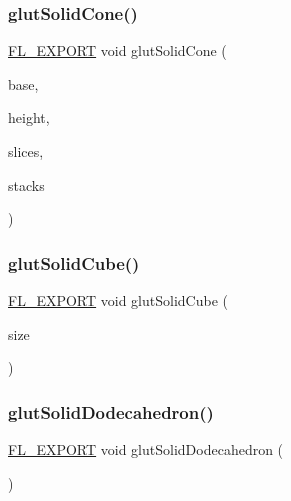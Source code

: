 \subsubsection{\texorpdfstring{glut\+Solid\+Cone()}{glutSolidCone()}}
{\footnotesize\ttfamily \hyperlink{_fl___export_8_h_aa9ba29a18aee9d738370a06eeb4470fc}{F\+L\+\_\+\+E\+X\+P\+O\+RT} void glut\+Solid\+Cone (\begin{DoxyParamCaption}\item[{G\+Ldouble}]{base,  }\item[{G\+Ldouble}]{height,  }\item[{G\+Lint}]{slices,  }\item[{G\+Lint}]{stacks }\end{DoxyParamCaption})}

\mbox{\label{glut_8_h_a129c177869766ce7b05d2465c016cd1d}} 
\subsubsection{\texorpdfstring{glut\+Solid\+Cube()}{glutSolidCube()}}
{\footnotesize\ttfamily \hyperlink{_fl___export_8_h_aa9ba29a18aee9d738370a06eeb4470fc}{F\+L\+\_\+\+E\+X\+P\+O\+RT} void glut\+Solid\+Cube (\begin{DoxyParamCaption}\item[{G\+Ldouble}]{size }\end{DoxyParamCaption})}

\mbox{\label{glut_8_h_a2d26e5dd9997f1eaaf7afdbed4f1422b}} 
\subsubsection{\texorpdfstring{glut\+Solid\+Dodecahedron()}{glutSolidDodecahedron()}}
{\footnotesize\ttfamily \hyperlink{_fl___export_8_h_aa9ba29a18aee9d738370a06eeb4470fc}{F\+L\+\_\+\+E\+X\+P\+O\+RT} void glut\+Solid\+Dodecahedron (\begin{DoxyParamCaption}{ }\end{DoxyParamCaption})}

\mbox{\label{glut_8_h_abf026c7cf0f08002141b232a58bd94c0}} 
